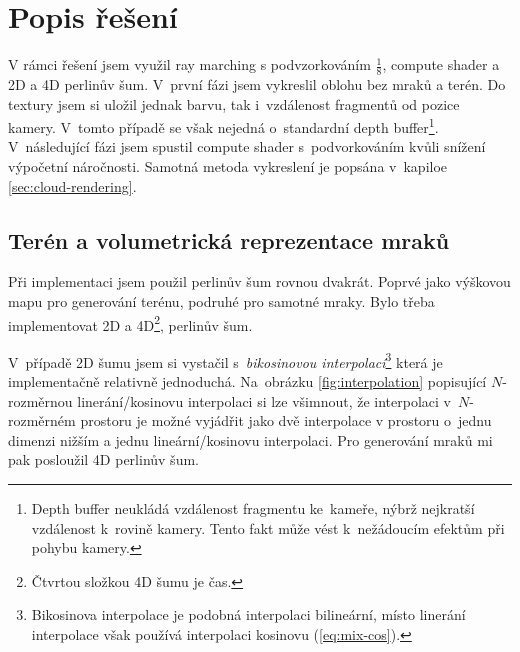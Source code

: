 \documentclass[a4paper, 12pt]{article}
\begin{document}

\section{Popis řešení}

%

V rámci řešení jsem využil ray marching s podvzorkováním $\frac{1}{8}$,
compute shader a 2D a 4D perlinův šum.
V~první fázi jsem vykreslil oblohu bez mraků a terén. Do textury jsem
si uložil jednak barvu, tak i~vzdálenost fragmentů od pozice kamery. V~tomto
případě se však nejedná o~standardní depth buffer\footnote{
Depth buffer neukládá vzdálenost fragmentu ke~kameře, nýbrž
nejkratší vzdálenost k~rovině kamery. Tento fakt může vést k~nežádoucím efektům
při pohybu kamery.}.
V~následující fázi jsem spustil compute shader s~podvorkováním kvůli snížení
výpočetní náročnosti. Samotná metoda vykreslení je popsána v~kapiloe \ref{sec:cloud-rendering}.

\subsection{Terén a volumetrická reprezentace mraků}

Při implementaci jsem použil perlinův šum rovnou dvakrát.
Poprvé jako výškovou mapu pro generování terénu, podruhé pro samotné mraky.
Bylo třeba implementovat 2D a 4D\footnote{Čtvrtou složkou 4D šumu je čas.},
perlinův šum.

V~případě 2D šumu jsem si vystačil s~\textit{bikosinovou interpolací}\footnote{
Bikosinova interpolace je podobná interpolaci bilineární, místo
linerání interpolace však používá interpolaci kosinovu (\ref{eq:mix-cos}).
}
která je implementačně relativně jednoduchá. Na~obrázku \ref{fig:interpolation}
popisující $N$-rozměrnou linerání/kosinovu interpolaci si lze všimnout,
že interpolaci v~$N$-rozměrném prostoru je možné vyjádřit jako dvě interpolace
v prostoru o~jednu dimenzi nižším a jednu lineární/kosinovu interpolaci.
Pro generování mraků mi pak posloužil 4D perlinův šum.
\end{document}
